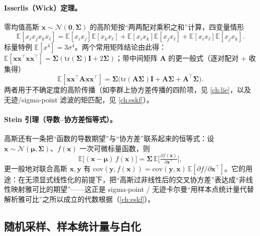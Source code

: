 \paragraph{Isserlis（Wick）定理。}
零均值高斯 $\mathbf{x}\sim\mathcal{N}(\mathbf{0},\boldsymbol{\Sigma})$ 的高阶矩按“两两配对乘积之和”计算，四变量情形
\begin{equation}
  \mathbb{E}[x_i x_j x_k x_\ell]=\mathbb{E}[x_i x_j]\mathbb{E}[x_k x_\ell]+\mathbb{E}[x_i x_k]\mathbb{E}[x_j x_\ell]+\mathbb{E}[x_i x_\ell]\mathbb{E}[x_j x_k].
  \label{eq:isserlis}
\end{equation}
标量特例 $\mathbb{E}[x^4]=3\sigma^4$。两个常用矩阵结论由此得：$\mathbb{E}[\mathbf{x}\mathbf{x}^\top\mathbf{x}\mathbf{x}^\top]=\boldsymbol{\Sigma}(\mathrm{tr}(\boldsymbol{\Sigma})\mathbf{I}+2\boldsymbol{\Sigma})$；带中间矩阵 $\mathbf{A}$ 的更一般式（逐对配对 + 收集得）
\begin{equation}
  \mathbb{E}[\mathbf{x}\mathbf{x}^\top\mathbf{A}\mathbf{x}\mathbf{x}^\top]=\boldsymbol{\Sigma}\big(\mathrm{tr}(\mathbf{A}\boldsymbol{\Sigma})\mathbf{I}+\mathbf{A}\boldsymbol{\Sigma}+\mathbf{A}^\top\boldsymbol{\Sigma}\big).
  \label{eq:isserlis-A}
\end{equation}
两者用于不确定度的高阶传播（如李群上协方差传播的四阶项，见 \cref{ch:lie}，以及无迹/sigma-point 滤波的矩匹配，见 \cref{ch:eskf}）。

\paragraph{Stein 引理（导数–协方差恒等式）。}
高斯还有一条把“函数的导数期望”与“协方差”联系起来的恒等式：设 $\mathbf{x}\sim\mathcal{N}(\boldsymbol{\mu},\boldsymbol{\Sigma})$、$f(\mathbf{x})$ 一次可微标量函数，则\cite{barfoot2024state}
\begin{equation}
  \mathbb{E}\big[(\mathbf{x}-\boldsymbol{\mu})\,f(\mathbf{x})\big]=\boldsymbol{\Sigma}\,\mathbb{E}\!\Big[\tfrac{\partial f(\mathbf{x})}{\partial\mathbf{x}^\top}\Big],
  \label{eq:stein}
\end{equation}
更一般地对联合高斯 $\mathbf{x},\mathbf{y}$ 有 $\mathrm{cov}(\mathbf{y},f(\mathbf{x}))=\mathrm{cov}(\mathbf{y},\mathbf{x})\,\mathbb{E}[\partial f/\partial\mathbf{x}^\top]$。它的用途：在无须显式线性化的前提下，把“高斯过非线性后的交叉协方差”表达成“非线性映射雅可比的期望”——这正是 sigma-point / 无迹卡尔曼“用样本点统计量代替解析雅可比”之所以成立的代数根据（\cref{ch:eskf}）。

\subsection{随机采样、样本统计量与白化}
\label{sec:est-sampling}

